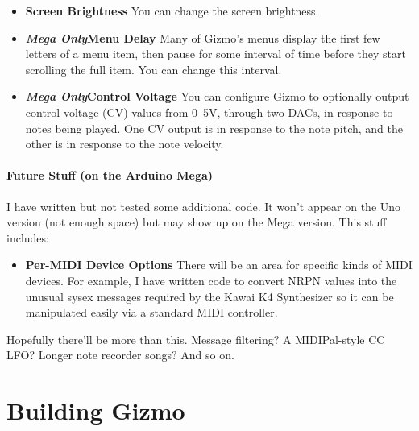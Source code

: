 \documentclass{article}
\begin{document}
\begin{itemize}
\item {\bf Screen Brightness}  You can change the screen brightness.  

\item {\bf \textit{Mega Only}\quad Menu Delay}  Many of Gizmo's menus display the first few letters of a menu item, then pause for some interval of time before they start scrolling the full item.  You can change this interval.

\item {\bf \textit{Mega Only}\quad Control Voltage}  You can configure Gizmo to optionally output control voltage (CV) values from 0--5V, through two DACs, in response to notes being played.    One CV output is in response to the note pitch, and the other is in response to the note velocity.

\end{itemize} 

\paragraph{Future Stuff (on the Arduino Mega)}

I have written but not tested some additional code.  It won't appear on the Uno version (not enough space) but may show up on the Mega version.  This stuff includes:

\begin{itemize}

\item {\bf Per-MIDI Device Options}  There will be an area for specific kinds of MIDI devices.  For example, I have written code to convert NRPN values into the unusual sysex messages required by the Kawai K4 Synthesizer so it can be manipulated easily via a standard MIDI controller.

\end{itemize}

Hopefully there'll be more than this.  Message filtering?  A MIDIPal-style CC LFO?  Longer note recorder songs?  And so on.

\section{Building Gizmo}
\end{document}
